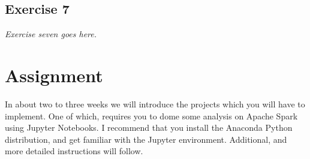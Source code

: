 \subsection*{Exercise 7}
\label{sec:exercise_7}

\emph{Exercise seven goes here.}

\section{Assignment}
\label{sec:assignment}

In about two to three weeks we will introduce the projects which you will have to implement. One of which, requires you to dome some analysis on Apache Spark using Jupyter Notebooks. I recommend that you install the Anaconda Python distribution, and get familiar with the Jupyter environment. Additional, and more detailed instructions will follow.


